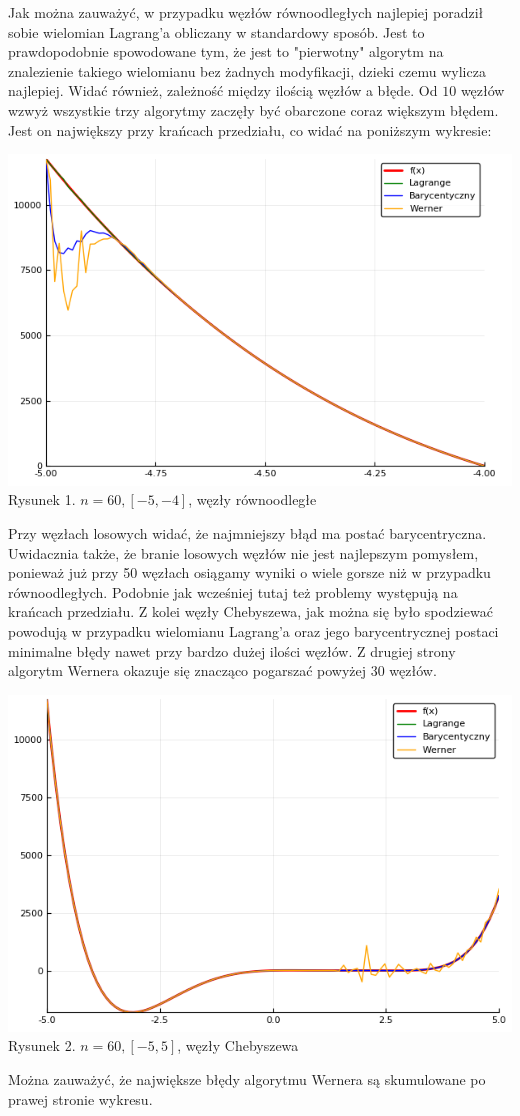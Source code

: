 \documentclass[11pt, wide]{article}
\begin{document}
Jak można zauważyć, w przypadku węzłów równoodległych najlepiej poradził sobie
wielomian Lagrang'a obliczany w standardowy sposób. Jest to prawdopodobnie spowodowane tym,
że jest to "pierwotny" algorytm na znalezienie takiego wielomianu bez żadnych modyfikacji, dzieki czemu
wylicza najlepiej. Widać również, zależność między ilością węzłów a błęde. Od $10$ węzłów
wzwyż wszystkie trzy algorytmy zaczęły być obarczone coraz większym błędem. Jest on największy
przy krańcach przedziału, co widać na poniższym wykresie:
\begin{center}
    \includegraphics[scale=0.4]{wykres1}\\
    Rysunek 1. $n = 60, [-5,-4]$, węzły równoodległe
\end{center}
Przy węzłach losowych widać, że najmniejszy błąd ma postać barycentryczna. Uwidacznia także, że branie
losowych węzłów nie jest najlepszym pomysłem, ponieważ już przy 50 węzłach osiągamy wyniki o wiele gorsze niż w przypadku
równoodległych. Podobnie jak wcześniej tutaj też problemy występują na krańcach przedziału. Z kolei węzły 
Chebyszewa, jak można się było spodziewać powodują w przypadku wielomianu Lagrang'a oraz jego barycentrycznej postaci
minimalne błędy nawet przy bardzo dużej ilości węzłów. Z drugiej strony algorytm Wernera okazuje się znacząco pogarszać
powyżej 30 węzłów.
\begin{center}
    \includegraphics[scale=0.4]{wykres2}\\
    Rysunek 2. $n = 60, [-5,5]$, węzły Chebyszewa
\end{center}
Można zauważyć, że największe błędy algorytmu Wernera są skumulowane po prawej stronie wykresu.
\end{document}
